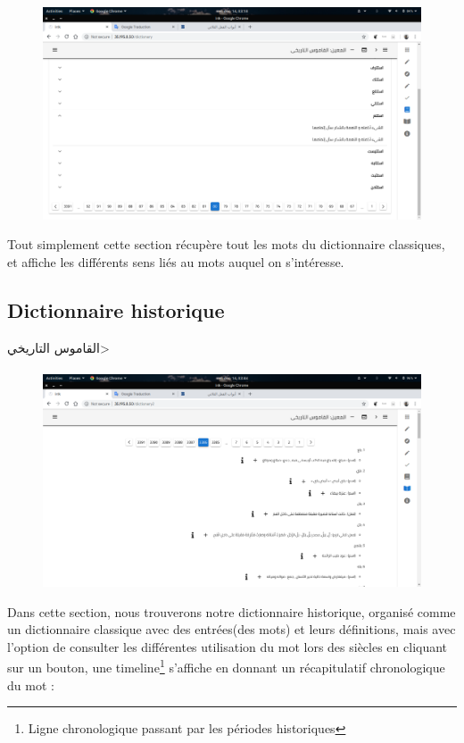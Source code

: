 \documentclass[]{report}
\begin{document}
			\paragraph{}
			\begin{figure}[H]
				\centering
				\includegraphics[width=0.8\linewidth]{images/app/allwords.png}
			\end{figure}
			Tout simplement cette section récupère tout les mots du dictionnaire classiques, et affiche les différents sens liés
			au mots auquel on s'intéresse.
			
		\subsection{Dictionnaire historique}
		\Large{\<القاموس التاريخي>}
			\paragraph{}
			\begin{figure}[H]
				\centering
				\includegraphics[width=0.8\linewidth]{images/app/histdico.png}
			\end{figure}
			Dans cette section, nous trouverons notre dictionnaire historique, organisé comme un dictionnaire classique avec des entrées(des mots) et leurs définitions, mais avec l'option de consulter les différentes utilisation du mot lors des siècles en cliquant sur un bouton, une timeline\footnote{Ligne chronologique passant par les périodes historiques} s'affiche en donnant un récapitulatif chronologique du mot : 
			
\end{document}
